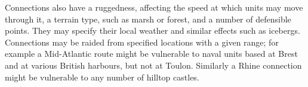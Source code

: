 \documentclass[12pt]{book}
\begin{document}
Connections also have a ruggedness, affecting the speed at which units
may move through it, a terrain type, such as marsh or forest, and a
number of defensible points. They may specify their local weather and
similar effects such as icebergs. Connections may be raided from
specified locations with a given range; for example a Mid-Atlantic
route might be vulnerable to naval units based at Brest and at various
British harbours, but not at Toulon. Similarly a Rhine connection
might be vulnerable to any number of hilltop castles.
\end{document}

